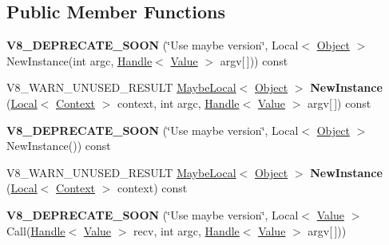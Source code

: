 \subsection*{Public Member Functions}
\begin{DoxyCompactItemize}
\item 
\hypertarget{classv8_1_1_function_ac4930cef5771c7c3e33f1926bd9a5a61}{}{\bfseries V8\+\_\+\+D\+E\+P\+R\+E\+C\+A\+T\+E\+\_\+\+S\+O\+O\+N} (\char`\"{}Use maybe version\char`\"{}, Local$<$ \hyperlink{classv8_1_1_object}{Object} $>$ New\+Instance(int argc, \hyperlink{classv8_1_1_local}{Handle}$<$ \hyperlink{classv8_1_1_value}{Value} $>$ argv\mbox{[}$\,$\mbox{]})) const \label{classv8_1_1_function_ac4930cef5771c7c3e33f1926bd9a5a61}

\item 
\hypertarget{classv8_1_1_function_aafec781d9ab11ec728ca0f56b6e96cd9}{}V8\+\_\+\+W\+A\+R\+N\+\_\+\+U\+N\+U\+S\+E\+D\+\_\+\+R\+E\+S\+U\+L\+T \hyperlink{classv8_1_1_maybe_local}{Maybe\+Local}$<$ \hyperlink{classv8_1_1_object}{Object} $>$ {\bfseries New\+Instance} (\hyperlink{classv8_1_1_local}{Local}$<$ \hyperlink{classv8_1_1_context}{Context} $>$ context, int argc, \hyperlink{classv8_1_1_local}{Handle}$<$ \hyperlink{classv8_1_1_value}{Value} $>$ argv\mbox{[}$\,$\mbox{]}) const \label{classv8_1_1_function_aafec781d9ab11ec728ca0f56b6e96cd9}

\item 
\hypertarget{classv8_1_1_function_a0e2c07a09b4fa116a12bf821a4d41cf3}{}{\bfseries V8\+\_\+\+D\+E\+P\+R\+E\+C\+A\+T\+E\+\_\+\+S\+O\+O\+N} (\char`\"{}Use maybe version\char`\"{}, Local$<$ \hyperlink{classv8_1_1_object}{Object} $>$ New\+Instance()) const \label{classv8_1_1_function_a0e2c07a09b4fa116a12bf821a4d41cf3}

\item 
\hypertarget{classv8_1_1_function_aae5c830b715559ab0d2e941ad8181cb2}{}V8\+\_\+\+W\+A\+R\+N\+\_\+\+U\+N\+U\+S\+E\+D\+\_\+\+R\+E\+S\+U\+L\+T \hyperlink{classv8_1_1_maybe_local}{Maybe\+Local}$<$ \hyperlink{classv8_1_1_object}{Object} $>$ {\bfseries New\+Instance} (\hyperlink{classv8_1_1_local}{Local}$<$ \hyperlink{classv8_1_1_context}{Context} $>$ context) const \label{classv8_1_1_function_aae5c830b715559ab0d2e941ad8181cb2}

\item 
\hypertarget{classv8_1_1_function_aa0b886e212e3faecf5d4a7485c152d4f}{}{\bfseries V8\+\_\+\+D\+E\+P\+R\+E\+C\+A\+T\+E\+\_\+\+S\+O\+O\+N} (\char`\"{}Use maybe version\char`\"{}, Local$<$ \hyperlink{classv8_1_1_value}{Value} $>$ Call(\hyperlink{classv8_1_1_local}{Handle}$<$ \hyperlink{classv8_1_1_value}{Value} $>$ recv, int argc, \hyperlink{classv8_1_1_local}{Handle}$<$ \hyperlink{classv8_1_1_value}{Value} $>$ argv\mbox{[}$\,$\mbox{]}))\label{classv8_1_1_function_aa0b886e212e3faecf5d4a7485c152d4f}


\end{DoxyCompactItemize}
